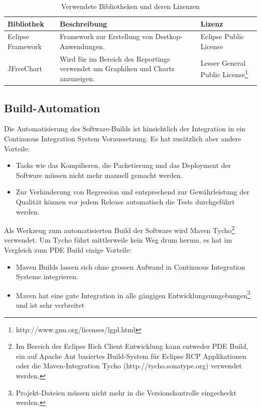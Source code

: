 \begin{longtable}{|p{3cm}|p{7cm}|p{4cm}|}
    \caption{Verwendete Bibliotheken und deren Lizenzen}\\\hline
	\textbf{Bibliothek} & \textbf{Beschreibung}  & \textbf{Lizenz}\\\hline
	Eclipse Framework & Framework zur Erstellung von Destkop-Anwendungen. & Eclipse Public License\\\hline 
	JFreeChart & Wird für im Bereich des Reportings verwendet um Graphiken und Charts anzuzeigen. & Lesser General Public License\footnote{http://www.gnu.org/licenses/lgpl.html}\\\hline
\end{longtable}

\subsection{Build-Automation}
Die Automatisierung des Software-Builds ist hinsichtlich der Integration in ein Continuous Integration System Voraussetzung. Es hat zusätzlich aber andere Vorteile:
\begin{itemize}
	\item Tasks wie das Kompilieren, die Packetierung und das Deployment der Software müssen nicht mehr manuell gemacht werden.
	\item Zur Verhinderung von Regression und entsprechend zur Gewährleistung der Qualität können vor jedem Release automatisch die Tests durchgeführt werden.
\end{itemize}


Als Werkzeug zum automatisierten Build der Software wird Maven Tycho\footnote{Im Bereich der Eclipse Rich Client Entwicklung kann entweder PDE Build, ein auf Apache Ant basiertes Build-System für Eclipse RCP Applikationen\cite{vogelZapfPdeBuild} oder die Maven-Integration Tycho (http://tycho.sonatype.org) verwendet werden.} verwendet. Um Tycho führt mittlerweile kein Weg drum herum, es hat im Vergleich zum PDE Build einige Vorteile:
\begin{itemize}
	\item Maven Builds lassen sich ohne grossen Aufwand in Continuous Integration Systeme integrieren.
	\item Maven hat eine gute Integration in alle gängigen Entwicklungsumgebungen\footnote{Projekt-Dateien müssen nicht mehr in die Versionskontrolle eingecheckt werden.} und ist sehr verbreitet
\end{itemize}

